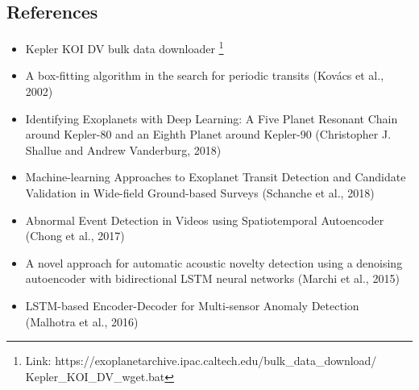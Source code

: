 \documentclass[%
aip,
amsmath,amssymb,
reprint,%
]{revtex4-1}
\begin{document}
\subsection{References}
\begin{itemize}
\item Kepler KOI DV bulk data downloader \footnote{Link: https://exoplanetarchive.ipac.caltech.edu/bulk\_data\_download/\\Kepler\_KOI\_DV\_wget.bat}
\item A box-fitting algorithm in the search for periodic transits (Kovács et al., 2002)
\item Identifying Exoplanets with Deep Learning: A Five Planet Resonant Chain around Kepler-80 and an Eighth Planet around Kepler-90 (Christopher J. Shallue and Andrew Vanderburg, 2018)
\item Machine-learning Approaches to Exoplanet Transit Detection and Candidate Validation in Wide-field Ground-based Surveys (Schanche et al., 2018)
\item Abnormal Event Detection in Videos using Spatiotemporal Autoencoder (Chong et al., 2017)
\item A novel approach for automatic acoustic novelty detection using a denoising autoencoder with bidirectional LSTM neural networks (Marchi et al., 2015)
\item LSTM-based Encoder-Decoder for Multi-sensor Anomaly Detection (Malhotra et al., 2016)
\end{itemize}
\end{document}
